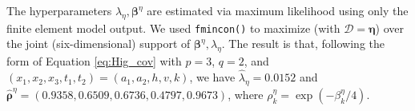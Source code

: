 \documentclass[12pt]{article}
\begin{document}
The hyperparameters $\lambda_\eta,\boldsymbol \beta^\eta$ are estimated %
% 
via maximum likelihood using only the finite element model output.
% 
%
We used \texttt{fmincon()} \citep{MATLAB2017} %
to maximize (with $\mathcal D=\boldsymbol\eta$) over the joint (six-dimensional) support of $\boldsymbol \beta^\eta,\lambda_\eta$.  
%
The result is that, following the form of Equation \eqref{eq:Hig_cov} with $p=3$, $q=2$, and $(x_1,x_2,x_3,t_1,t_2)=(a_1,a_2,h,v,k)$, we have $\hat\lambda_\eta = 0.0152$ and $\boldsymbol {\hat\rho}^\eta = (0.9358, 0.6509, 0.6736, 0.4797, 0.9673)$, 
where $\rho^\eta_k = \exp(-\beta_k^\eta/4)$.
%
\end{document}
